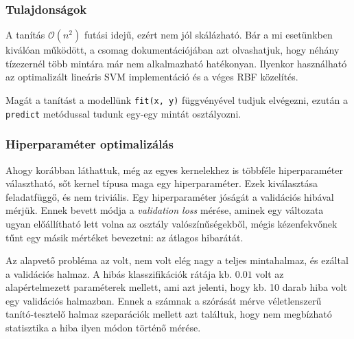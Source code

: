 \subsubsection{Tulajdonságok}

\noindent
A tanítás $ \mathcal{O}(n^2) $ futási idejű, ezért nem jól skálázható. Bár a mi 
esetünkben kiválóan működött, a csomag dokumentációjában azt olvashatjuk, hogy néhány tízezernél
több mintára már nem alkalmazható hatékonyan. Ilyenkor használható az optimalizált lineáris SVM implementáció\footnotemark \cite{fan2008liblinear} és a véges RBF közelítés\footnotemark \cite{rahimi2008random}.



\addtocounter{footnote}{-1}

\addtocounter{footnote}{1}

Magát a tanítást a modellünk \texttt{fit(x, y)} függvényével tudjuk elvégezni, ezután 
a \texttt{predict} metódussal tudunk egy-egy mintát osztályozni.



\subsubsection{Hiperparaméter optimalizálás}
\label{sec:svm.hiperparameter.optimalizalas}

Ahogy korábban láthattuk, még az egyes kernelekhez is többféle hiperparaméter választható, sőt kernel típusa maga egy hiperparaméter. Ezek kiválasztása
feladatfüggő, és nem triviális. Egy hiperparaméter jóságát a validációs hibával mérjük. Ennek 
bevett módja a \textit{validation loss} mérése, aminek egy változata ugyan előállítható lett volna 
az osztály valószínűségekből, mégis kézenfekvőnek tűnt egy másik mértéket bevezetni: az átlagos hibarátát.


Az alapvető probléma az volt, nem volt elég nagy a teljes mintahalmaz, és ezáltal a validációs halmaz.
A hibás klasszifikációk rátája kb. $ 0.01 $ volt az alapértelmezett paraméterek mellett, ami azt
jelenti, hogy kb. 10 darab hiba volt egy validációs halmazban. Ennek a számnak a szórását mérve véletlenszerű
tanító-tesztelő halmaz szeparációk mellett azt találtuk, hogy nem megbízható statisztika a 
hiba ilyen módon történő mérése.

